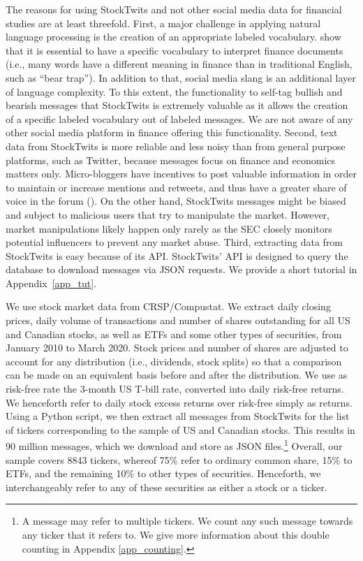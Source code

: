 The reasons for using StockTwits and not other social media data for financial studies are at least threefold. First, a major challenge in applying natural language processing is the creation of an appropriate labeled vocabulary. \citet{loughran2011barron} show that it is essential to have a specific vocabulary to interpret finance documents (i.e., many words have a different meaning in finance than in traditional English, such as “bear trap”). In addition to that, social media slang is an additional layer of language complexity. To this extent, the functionality to self-tag bullish and bearish messages that StockTwits is extremely valuable as it allows the creation of a specific labeled vocabulary out of labeled messages. We are not aware of any other social media platform in finance offering this functionality. Second, text data from StockTwits is more reliable and less noisy than from general purpose platforms, such as Twitter, because messages focus on finance and economics matters only. Micro-bloggers have incentives to post valuable information in order to maintain or increase mentions and retweets, and thus have a greater share of voice in the forum (\citet{sprenger2014tweets}). On the other hand, StockTwits messages might be biased and subject to malicious users that try to manipulate the market. However, market manipulations likely happen only rarely as the SEC closely monitors potential influencers to prevent any market abuse. Third, extracting data from StockTwits is easy because of its API. StockTwits' API is designed to query the database to download messages via JSON requests. We provide a short tutorial in Appendix~\ref{app_tut}.

We use stock market data from CRSP/Compustat. We extract daily closing prices, daily volume of transactions and number of shares outstanding for all US and Canadian stocks, as well as ETFs and some other types of securities, from January 2010 to March 2020. Stock prices and number of shares are adjusted to account for any distribution (i.e., dividends, stock splits) so that a comparison can be made on an equivalent basis before and after the distribution. We use as risk-free rate the 3-month US T-bill rate, converted into daily risk-free returns. We henceforth refer to daily stock excess returns over risk-free simply as returns. Using a Python script, we then extract all messages from StockTwits for the list of tickers corresponding to the sample of US and Canadian stocks. This results in 90 million messages, which we download and store as JSON files.\footnote{A message may refer to multiple tickers. We count any such message towards any ticker that it refers to. We give more information about this double counting in Appendix \ref{app_counting}.} Overall, our sample covers 8843 tickers, whereof 75\% refer to ordinary common share, 15\% to ETFs, and the remaining 10\% to other types of securities. Henceforth, we interchangeably refer to any of these securities as either a stock or a ticker. 

